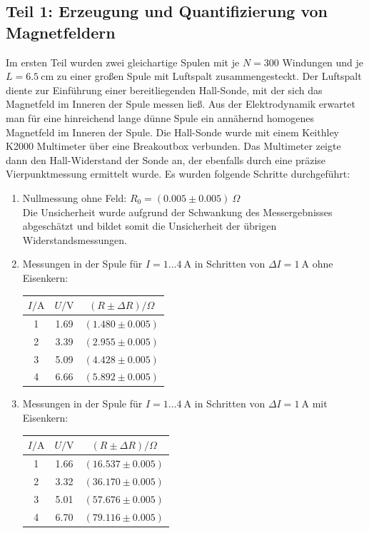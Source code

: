 \documentclass[german,  %
parskip=full,  %
]{scrartcl}
\begin{document}
\subsection{Teil 1: Erzeugung und Quantifizierung von Magnetfeldern}
Im ersten Teil wurden zwei gleichartige Spulen mit je \(N=300\) Windungen und je \(L=6.5 \ \mathrm{cm}\) zu einer großen Spule mit Luftspalt zusammengesteckt. Der Luftspalt diente zur Einführung einer bereitliegenden Hall-Sonde, mit der sich das Magnetfeld im Inneren der Spule messen ließ. Aus der Elektrodynamik erwartet man für eine hinreichend lange dünne Spule ein annähernd homogenes Magnetfeld im Inneren der Spule. Die Hall-Sonde wurde mit einem Keithley K2000 Multimeter über eine Breakoutbox verbunden. Das Multimeter zeigte dann den Hall-Widerstand der Sonde an, der ebenfalls durch eine präzise Vierpunktmessung ermittelt wurde. Es wurden folgende Schritte durchgeführt:
\begin{enumerate}
\item Nullmessung ohne Feld: \(R_0 = (0.005 \pm 0.005) \ \Omega\) \\
Die Unsicherheit wurde aufgrund der Schwankung des Messergebnisses abgeschätzt und bildet somit die Unsicherheit der übrigen Widerstandsmessungen.
\item Messungen in der Spule für \(I = 1\hdots 4 \ \mathrm{A}\) in Schritten von \(\Delta I = 1 \  \mathrm{A}\) ohne Eisenkern:
\begin{table}[h!]\centering
\begin{tabular}{|c|c|c|}
\hline
\(I/ \mathrm{A}\) & \(U / \mathrm{V}\) & \((R \pm \Delta R )/ \Omega\) \\\hline
1 & 1.69 & \((1.480 \pm 0.005)\) \\\hline
2 & 3.39 & \((2.955 \pm 0.005)\) \\\hline
3 & 5.09 & \((4.428 \pm 0.005)\) \\\hline
4 & 6.66 & \((5.892 \pm 0.005)\) \\\hline
\end{tabular}
\end{table}
\item Messungen in der Spule für \(I = 1\hdots 4 \ \mathrm{A}\) in Schritten von \(\Delta I = 1 \  \mathrm{A}\) mit Eisenkern:
\begin{table}[h!]\centering
\begin{tabular}{|c|c|c|}
\hline
\(I/ \mathrm{A}\) & \(U / \mathrm{V}\) & \((R \pm \Delta R )/ \Omega\)  \\\hline
1 & 1.66 & \((16.537 \pm 0.005)\) \\\hline
2 & 3.32 & \((36.170 \pm 0.005)\) \\\hline
3 & 5.01 & \((57.676 \pm 0.005)\) \\\hline
4 & 6.70 & \((79.116 \pm 0.005)\) \\\hline
\end{tabular}
\end{table}
\end{enumerate}
\end{document}
